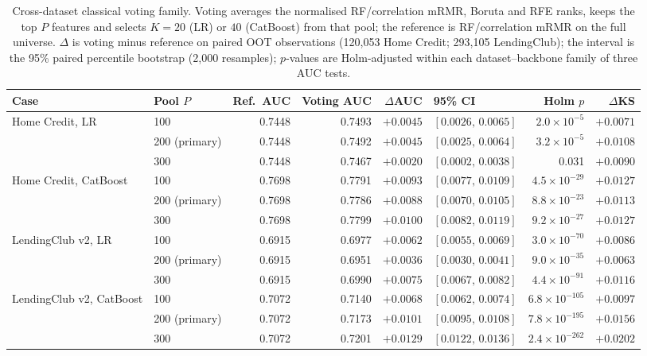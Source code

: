 \documentclass[final,5p,twocolumn]{elsarticle}
\newcommand{\Kfeat}{K}
\begin{document}
\begin{table}[htbp]
\centering
\scriptsize
\setlength{\tabcolsep}{4pt}
\begin{threeparttable}
\caption{Cross-dataset classical voting family. Voting averages the normalised RF/correlation mRMR, Boruta and RFE ranks, keeps the top $P$ features and selects $\Kfeat=20$ (LR) or $40$ (CatBoost) from that pool; the reference is RF/correlation mRMR on the full universe. $\Delta$ is voting minus reference on paired OOT observations (120,053 Home Credit; 293,105 LendingClub); the interval is the 95\% paired percentile bootstrap (2,000 resamples); $p$-values are Holm-adjusted within each dataset--backbone family of three AUC tests.}
\label{tab:voting_cross}
\begin{tabular}{@{}llrrrlrr@{}}
\toprule
Case & Pool $P$ & Ref.\ AUC & Voting AUC & $\Delta$AUC & 95\% CI & Holm $p$ & $\Delta$KS \\
\midrule
Home Credit, LR & 100 & 0.7448 & 0.7493 & $+0.0045$ & $[0.0026,\,0.0065]$ & $2.0\times10^{-5}$ & $+0.0071$ \\
 & 200 (primary) & 0.7448 & 0.7492 & $+0.0045$ & $[0.0025,\,0.0064]$ & $3.2\times10^{-5}$ & $+0.0108$ \\
 & 300 & 0.7448 & 0.7467 & $+0.0020$ & $[0.0002,\,0.0038]$ & 0.031 & $+0.0090$ \\
\addlinespace
Home Credit, CatBoost & 100 & 0.7698 & 0.7791 & $+0.0093$ & $[0.0077,\,0.0109]$ & $4.5\times10^{-29}$ & $+0.0127$ \\
 & 200 (primary) & 0.7698 & 0.7786 & $+0.0088$ & $[0.0070,\,0.0105]$ & $8.8\times10^{-23}$ & $+0.0113$ \\
 & 300 & 0.7698 & 0.7799 & $+0.0100$ & $[0.0082,\,0.0119]$ & $9.2\times10^{-27}$ & $+0.0127$ \\
\addlinespace
LendingClub v2, LR & 100 & 0.6915 & 0.6977 & $+0.0062$ & $[0.0055,\,0.0069]$ & $3.0\times10^{-70}$ & $+0.0086$ \\
 & 200 (primary) & 0.6915 & 0.6951 & $+0.0036$ & $[0.0030,\,0.0041]$ & $9.0\times10^{-35}$ & $+0.0063$ \\
 & 300 & 0.6915 & 0.6990 & $+0.0075$ & $[0.0067,\,0.0082]$ & $4.4\times10^{-91}$ & $+0.0116$ \\
\addlinespace
LendingClub v2, CatBoost & 100 & 0.7072 & 0.7140 & $+0.0068$ & $[0.0062,\,0.0074]$ & $6.8\times10^{-105}$ & $+0.0097$ \\
 & 200 (primary) & 0.7072 & 0.7173 & $+0.0101$ & $[0.0095,\,0.0108]$ & $7.8\times10^{-195}$ & $+0.0156$ \\
 & 300 & 0.7072 & 0.7201 & $+0.0129$ & $[0.0122,\,0.0136]$ & $2.4\times10^{-262}$ & $+0.0202$ \\
\bottomrule
\end{tabular}
\end{threeparttable}
\end{table}
\end{document}
